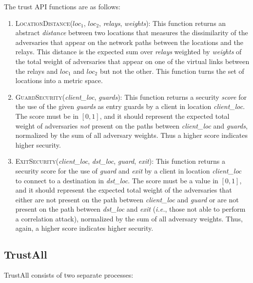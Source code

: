 \documentclass[conference]{styles/IEEEtran}
\newcommand{\ie}{\emph{i.e.}}
\newcommand{\compactify}{\settowidth{\labelsep}{o} \settowidth{\labelwidth}{o} \settowidth{\labelindent}{o}}
\begin{document}
The trust API functions are as follows:

\begin{enumerate}[\compactify]
\item \textsc{LocationDistance}($\textit{loc}_1$, $\textit{loc}_2$, \textit{relays},
    \textit{weights}): This
    function returns an abstract \textit{distance} between two locations that measures the
    dissimilarity of the adversaries that appear on the network paths between the locations and the
    relays. This distance is the expected
    sum over \textit{relays} weighted by \textit{weights} of the total weight of adversaries that
    appear on one of the virtual links between the relays and $\textit{loc}_1$ and $\textit{loc}_2$
    but not the other. This function turns the set of locations into a metric space.

\item \textsc{GuardSecurity}(\textit{client\_loc}, \textit{guards}): This
    function returns a security \textit{score} for the use of the given \textit{guards} as entry
    guards by a client in location \textit{client\_loc}. The score must be in $[0, 1]$, and it
    should represent the expected total weight of adversaries \emph{not} present on the paths
    between \textit{client\_loc} and \textit{guards}, normalized by the sum
    of all adversary weights. Thus a higher score indicates higher security.

\item \textsc{ExitSecurity}(\textit{client\_loc}, \textit{dst\_loc}, \textit{guard},
    \textit{exit}): This function returns a security score for the use of \textit{guard} and
    \textit{exit} by a client in location \textit{client\_loc} to connect to a destination in
    \textit{dst\_loc}. The score must be a value in $[0, 1]$, and it should
    represent the expected total weight of the adversaries that either are not present on the path
    between \textit{client\_loc} and \textit{guard} or are not present on the path between
    \textit{dst\_loc} and
    \textit{exit} (\ie{}, those not able to perform a correlation attack), normalized by the sum of
    all adversary weights. Thus, again, a higher score indicates higher security.
\end{enumerate}

\subsection{TrustAll}
TrustAll consists of two separate processes:
\end{document}
